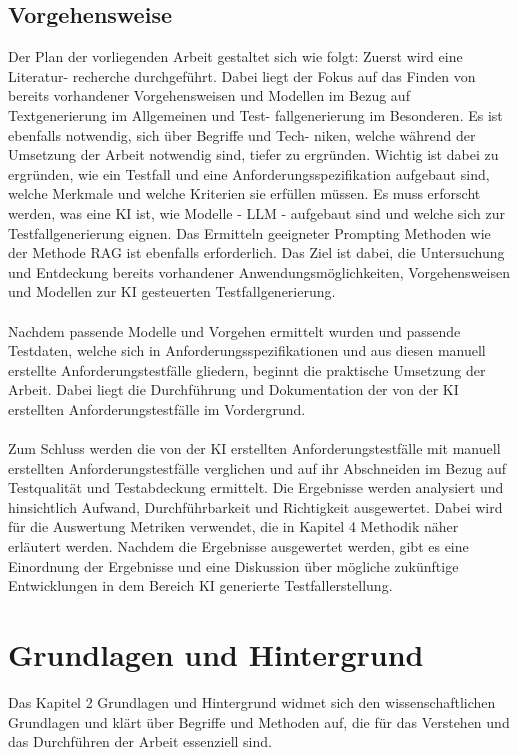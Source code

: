 \documentclass[12pt,toc=bib,toc=listof]{scrreprt}
\begin{document}
\section{Vorgehensweise} %
\label{sec:vorgehensweise}
Der Plan der vorliegenden Arbeit gestaltet sich wie folgt: Zuerst wird eine Literatur-
recherche durchgeführt. Dabei liegt der Fokus auf das Finden von bereits vorhandener
Vorgehensweisen und Modellen im Bezug auf Textgenerierung im Allgemeinen und Test-
fallgenerierung im Besonderen. Es ist ebenfalls notwendig, sich über Begriffe und Tech-
niken, welche während der Umsetzung der Arbeit notwendig sind, tiefer zu ergründen. 
Wichtig ist dabei zu ergründen, wie ein Testfall und eine Anforderungsspezifikation aufgebaut sind, welche Merkmale und welche Kriterien sie erfüllen müssen. Es muss erforscht werden, was eine KI ist, wie Modelle - LLM - aufgebaut sind und welche sich zur Testfallgenerierung eignen. Das Ermitteln geeigneter Prompting Methoden wie der Methode RAG ist ebenfalls erforderlich. Das Ziel ist dabei, die Untersuchung und Entdeckung bereits vorhandener Anwendungsmöglichkeiten, Vorgehensweisen und Modellen zur KI gesteuerten Testfallgenerierung.\\
\\
Nachdem passende Modelle und Vorgehen ermittelt wurden und passende Testdaten, welche sich in Anforderungsspezifikationen und aus diesen manuell erstellte Anforderungstestfälle gliedern, beginnt die praktische Umsetzung der Arbeit. Dabei liegt die Durchführung und Dokumentation der von der KI erstellten Anforderungstestfälle im Vordergrund.\\
\\
Zum Schluss werden die von der KI erstellten Anforderungstestfälle mit manuell erstellten Anforderungstestfälle verglichen und auf ihr Abschneiden im Bezug auf Testqualität und Testabdeckung ermittelt. Die Ergebnisse werden analysiert und hinsichtlich Aufwand, Durchführbarkeit und Richtigkeit ausgewertet. Dabei wird für die Auswertung Metriken verwendet, die in Kapitel 4 Methodik näher erläutert werden. Nachdem die Ergebnisse ausgewertet werden, gibt es eine Einordnung der Ergebnisse und eine Diskussion über mögliche zukünftige Entwicklungen in dem Bereich KI generierte Testfallerstellung.

\chapter{Grundlagen und Hintergrund} %
\label{sec:grundlagenUndHintergrund}
Das Kapitel 2 Grundlagen und Hintergrund widmet sich den wissenschaftlichen Grundlagen und klärt über Begriffe und Methoden auf, die für das Verstehen und das Durchführen der Arbeit essenziell sind.
\end{document}
